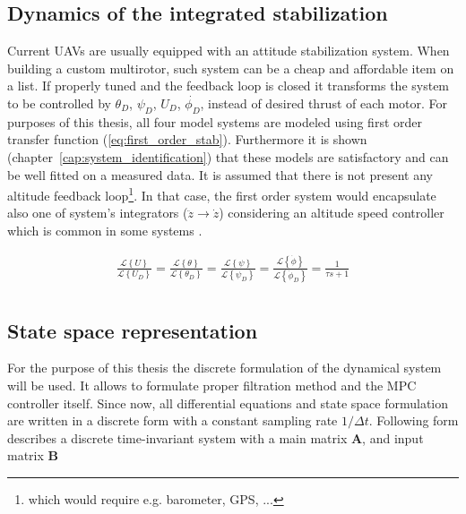 \subsection{Dynamics of the integrated stabilization}

Current UAVs are usually equipped with an attitude stabilization system. When building a custom multirotor, such system can be a cheap and affordable item on a list. If properly tuned and the feedback loop is closed it transforms the system to be controlled by $\theta_D$, $\psi_D$, $U_D$, $\dot{\phi_D}$, instead of desired thrust of each motor. For purposes of this thesis, all four model systems are modeled using first order transfer function (\ref{eq:first_order_stab}). Furthermore it is shown (chapter~\ref{cap:system_identification}) that these models are satisfactory and can be well fitted on a measured data. It is assumed that there is not present any altitude feedback loop\footnote{which would require e.g. barometer, GPS, ...}. In that case, the first order system would encapsulate also one of system's integrators ($\ddot{z} \rightarrow \dot{z}$) considering an altitude speed controller which is common in some systems \citep{pixhawk}\cite{ardupilot}.

\begin{equation}
\begin{split}
\frac{\mathcal{L}\left\lbrace U \right\rbrace}{\mathcal{L}\left\lbrace U_D \right\rbrace} = \frac{\mathcal{L}\left\lbrace \theta \right\rbrace}{\mathcal{L}\left\lbrace \theta_D \right\rbrace} = \frac{\mathcal{L}\left\lbrace \psi \right\rbrace}{\mathcal{L}\left\lbrace \psi_D \right\rbrace} = \frac{\mathcal{L}\left\lbrace \dot{\phi} \right\rbrace}{\mathcal{L}\left\lbrace \dot{\phi}_D \right\rbrace} = \frac{1}{\tau s + 1}\\
\end{split}
\label{eq:first_order_stab}
\end{equation}

\subsection{State space representation}

For the purpose of this thesis the discrete formulation of the dynamical system will be used. It allows to formulate proper filtration method and the MPC controller itself. Since now, all differential equations and state space formulation are written in a discrete form with a constant sampling rate $1/\Delta t$. Following form describes a discrete time-invariant system with a main matrix $\mathbf{A}$, and input matrix $\mathbf{B}$

